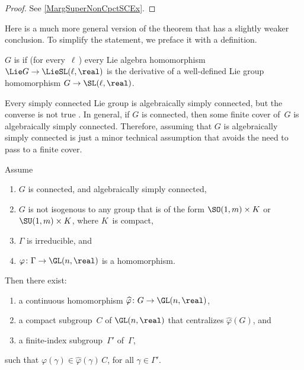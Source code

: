 \begin{proof}
See \cref{MargSuperNonCpctSCEx}.
\end{proof}

Here is a much more general version of the theorem that has a slightly weaker conclusion. To simplify the statement, we preface it with a definition. 

\begin{defn} \label{AlgSCDefn}
$G$ is  if (for every~$\ell$\,) every Lie algebra homomorphism $\Lie G \to \LieSL(\ell,\real)$ is the derivative of a well-defined Lie group homomorphism $G \to \SL(\ell,\real)$.
\end{defn}

\begin{rem}
Every simply connected Lie group is algebraically simply connected, but the converse is not true . In general, if $G$ is connected, then some finite cover of~$G$ is algebraically simply connected. Therefore, assuming that $G$ is algebraically simply connected is just a minor technical assumption that avoids the need to pass to a finite cover. 
\end{rem}

\begin{thm} \label{MargSuperC}
Assume
\noprelistbreak
	\begin{enumerate} \renewcommand{\theenumi}{\roman{enumi}}
	\item $G$ is connected, and algebraically simply connected,
	\item \label{MargSuperC-notSOSU}
	$G$ is not isogenous to any group that is of the form\/ $\SO(1,m) \times K$ or\/ $\SU(1,m) \times K$, where $K$~is compact,
	\item $\Gamma$ is irreducible,
	and
	\item $\varphi \colon \Gamma \to \GL(n,\real)$ is a homomorphism.
	\end{enumerate}
Then there exist:
\noprelistbreak
	\begin{enumerate}
	\item a continuous homomorphism $\widehat\varphi \colon G \to \GL(n,\real)$,
	\item a compact subgroup~$C$ of\/ $\GL(n,\real)$ that centralizes $\widehat\varphi(G)$,
	and
	\item a finite-index subgroup\/~$\Gamma'$ of\/~$\Gamma$,
	\end{enumerate}
such that $\varphi(\gamma) \in \widehat\varphi(\gamma) \, C$, for all $\gamma \in \Gamma'$.
\end{thm}

